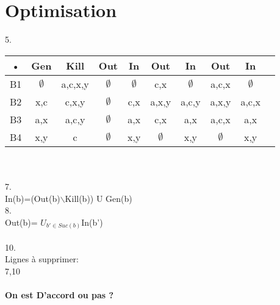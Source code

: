 \documentclass[10pt,a4paper]{article}
\begin{document}
\section{Optimisation}
5.\\
\begin{tabular}{|c|c|c|c|c|c|c|c|c|c|}
\hline 
• & Gen & Kill & Out & In & Out & In & Out & In  \\ 
\hline 
B1 & $\emptyset$ & a,c,x,y & $\emptyset$ & $\emptyset$ &c,x &$\emptyset$  & a,c,x &$\emptyset$   \\ 
\hline 
B2 & x,c & c,x,y & $\emptyset$ &c,x & a,x,y& a,c,y & a,x,y & a,c,x  \\ 
\hline 
B3 & a,x & a,c,y & $\emptyset$ & a,x & c,x & a,x & a,c,x & a,x \\ 
\hline 
B4 & x,y & c & $\emptyset$ & x,y &$\emptyset$ & x,y & $\emptyset$ & x,y  \\ 
\hline 
\end{tabular} 
\\
\\
7.\\
In(b)=(Out(b)$\backslash$Kill(b)) U Gen(b)\\
8.\\
Out(b)= $U_{b'\in Suc(b)} $In(b')
\\
\\
10.\\
Lignes à supprimer:\\
7,10\\
\\
\textbf{On est D'accord ou pas ?}
\end{document}
